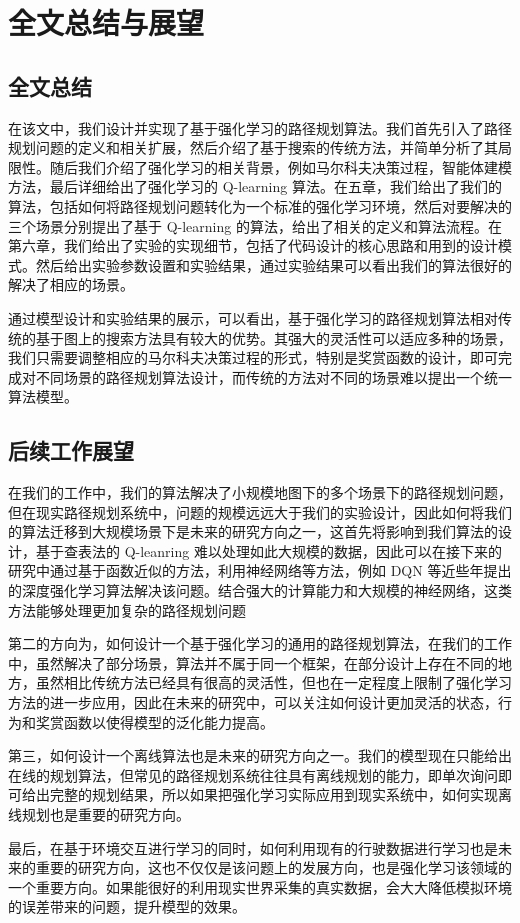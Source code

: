 \documentclass{standalone}
\begin{document}
\chapter{全文总结与展望}
\section{全文总结}
在该文中，我们设计并实现了基于强化学习的路径规划算法。我们首先引入了路径规划问题的定义和相关扩展，然后介绍了基于搜索的传统方法，并简单分析了其局限性。随后我们介绍了强化学习的相关背景，例如马尔科夫决策过程，智能体建模方法，最后详细给出了强化学习的 Q-learning 算法。在五章，我们给出了我们的算法，包括如何将路径规划问题转化为一个标准的强化学习环境，然后对要解决的三个场景分别提出了基于 Q-learning 的算法，给出了相关的定义和算法流程。在第六章，我们给出了实验的实现细节，包括了代码设计的核心思路和用到的设计模式。然后给出实验参数设置和实验结果，通过实验结果可以看出我们的算法很好的解决了相应的场景。\par
通过模型设计和实验结果的展示，可以看出，基于强化学习的路径规划算法相对传统的基于图上的搜索方法具有较大的优势。其强大的灵活性可以适应多种的场景，我们只需要调整相应的马尔科夫决策过程的形式，特别是奖赏函数的设计，即可完成对不同场景的路径规划算法设计，而传统的方法对不同的场景难以提出一个统一算法模型。
\section{后续工作展望}
在我们的工作中，我们的算法解决了小规模地图下的多个场景下的路径规划问题，但在现实路径规划系统中，问题的规模远远大于我们的实验设计，因此如何将我们的算法迁移到大规模场景下是未来的研究方向之一，这首先将影响到我们算法的设计，基于查表法的 Q-leanring 难以处理如此大规模的数据，因此可以在接下来的研究中通过基于函数近似的方法，利用神经网络等方法，例如 DQN 等近些年提出的深度强化学习算法解决该问题。结合强大的计算能力和大规模的神经网络，这类方法能够处理更加复杂的路径规划问题\par
第二的方向为，如何设计一个基于强化学习的通用的路径规划算法，在我们的工作中，虽然解决了部分场景，算法并不属于同一个框架，在部分设计上存在不同的地方，虽然相比传统方法已经具有很高的灵活性，但也在一定程度上限制了强化学习方法的进一步应用，因此在未来的研究中，可以关注如何设计更加灵活的状态，行为和奖赏函数以使得模型的泛化能力提高。\par
第三，如何设计一个离线算法也是未来的研究方向之一。我们的模型现在只能给出在线的规划算法，但常见的路径规划系统往往具有离线规划的能力，即单次询问即可给出完整的规划结果，所以如果把强化学习实际应用到现实系统中，如何实现离线规划也是重要的研究方向。\par
最后，在基于环境交互进行学习的同时，如何利用现有的行驶数据进行学习也是未来的重要的研究方向，这也不仅仅是该问题上的发展方向，也是强化学习该领域的一个重要方向。如果能很好的利用现实世界采集的真实数据，会大大降低模拟环境的误差带来的问题，提升模型的效果。
\end{document}
